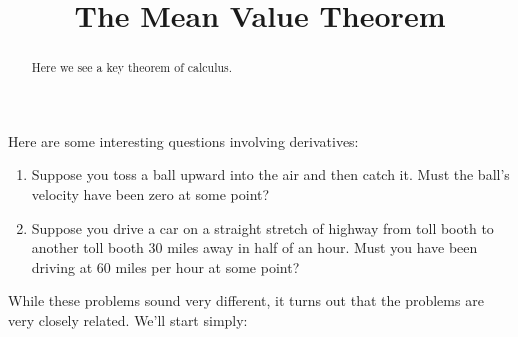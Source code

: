 \documentclass{ximera}
\title{The Mean Value Theorem}
\begin{document}
\begin{abstract}
  Here we see a key theorem of calculus.
\end{abstract}
\maketitle


Here are some interesting questions involving derivatives:

\begin{enumerate}
\item Suppose you toss a ball upward into the air and then catch it. Must the
  ball's  velocity have been zero at some point?
\item Suppose you drive a car on a straight stretch of highway from toll booth to
  another toll booth $30$ miles away in half of an hour. Must you have
  been driving at $60$ miles per hour at some point?
\end{enumerate}

While these problems sound very different, it turns out that the
problems are very closely related. We'll start simply:
\end{document}
